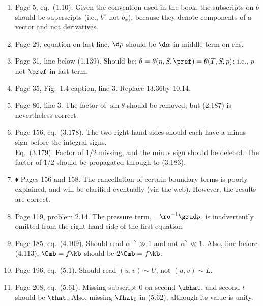 \documentclass[10pt]{article}
\newcommand{\eq}{eq.\ } \newcommand{\Eq}{Eq.\ }
\renewcommand{\star}{\ensuremath{\blacklozenge} }
\begin{document}
\begin{enumerate}

\item Page 5, \eq (1.10).  Given the  convention used in the book, the subscripts on $b$ should be superscipts (i.e., $b^x$ not $b_x$), because they denote components of a vector and not derivatives. 

\item Page 29, equation on last line. $\d p$ should be $\d \alpha$ in middle term on rhs.

\item Page 31, line below (1.139). Should be: $\theta = \theta(\eta, S, \pref) = \theta (T, S, p)$; i.e., $p$ not $\pref$ in last term.

\item Page 35, Fig.\ 1.4 caption, line 3. Replace 13.36\dgc by 10.14\dgc. 

\item Page 86, line 3. The factor of $\sin \theta$ should be removed, but (2.187) is nevertheless correct.


\item Page 156, \eq (3.178). The two right-hand sides should each have a minus sign before the integral signs. \\
\Eq (3.179). Factor of $1/2$ missing, and the minus sign should be deleted. The factor of 1/2 should be propagated through to (3.183). 

\item \star \label{cancel} Pages 156 and 158. The cancellation of certain boundary terms is poorly explained, and will be clarified eventually (via the web). However, the results are correct.  

\item Page 119, problem 2.14. The pressure term, $-\ro^{-1} \grad p$, is inadvertently omitted from the right-hand side of the first equation. 

\item Page 185, \eq (4.109). Should read $\alpha^{-2} \gg 1$ and not $\alpha^2 \ll 1$. Also, line before (4.113), $\Omb = f \kb$ should be $2\Omb = f \kb$.

\item Page 196, \eq (5.1). Should read $(u, v) \sim U$, not $(u,v) \sim L$.

\item Page 208, \eq (5.61). Missing subscript 0 on second $\ubhat$, and second $t$ should be $\that$. Also, missing $\fhat_0$ in (5.62), although its value is unity.


\end{enumerate}
\end{document}
